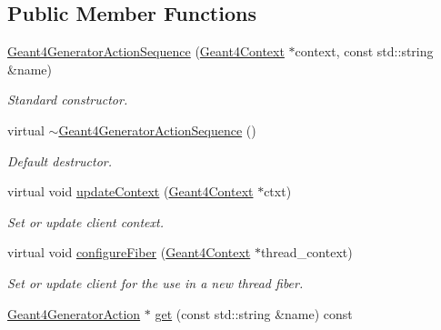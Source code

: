 \subsection*{Public Member Functions}
\begin{DoxyCompactItemize}
\item 
\hyperlink{class_d_d4hep_1_1_simulation_1_1_geant4_generator_action_sequence_a6faeaf2816abecfd4fa39eef4d6cda9c}{Geant4GeneratorActionSequence} (\hyperlink{class_d_d4hep_1_1_simulation_1_1_geant4_context}{Geant4Context} $\ast$context, const std::string \&name)
\begin{DoxyCompactList}\small\item\em Standard constructor. \item\end{DoxyCompactList}\item 
virtual \hyperlink{class_d_d4hep_1_1_simulation_1_1_geant4_generator_action_sequence_a69d6b2986aeafa1e9951700f4d023455}{$\sim$Geant4GeneratorActionSequence} ()
\begin{DoxyCompactList}\small\item\em Default destructor. \item\end{DoxyCompactList}\item 
virtual void \hyperlink{class_d_d4hep_1_1_simulation_1_1_geant4_generator_action_sequence_a52b0d18dd3c29e1b1e133d9e1c73284b}{updateContext} (\hyperlink{class_d_d4hep_1_1_simulation_1_1_geant4_context}{Geant4Context} $\ast$ctxt)
\begin{DoxyCompactList}\small\item\em Set or update client context. \item\end{DoxyCompactList}\item 
virtual void \hyperlink{class_d_d4hep_1_1_simulation_1_1_geant4_generator_action_sequence_a0ba4324a4f977eb12057e789eaf44f07}{configureFiber} (\hyperlink{class_d_d4hep_1_1_simulation_1_1_geant4_context}{Geant4Context} $\ast$thread\_\-context)
\begin{DoxyCompactList}\small\item\em Set or update client for the use in a new thread fiber. \item\end{DoxyCompactList}\item 
\hyperlink{class_d_d4hep_1_1_simulation_1_1_geant4_generator_action}{Geant4GeneratorAction} $\ast$ \hyperlink{class_d_d4hep_1_1_simulation_1_1_geant4_generator_action_sequence_adfb5656b40eeb07f148871e97a7d11f7}{get} (const std::string \&name) const 

\end{DoxyCompactItemize}
